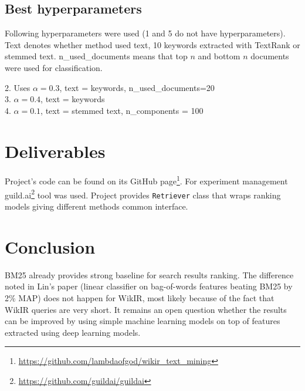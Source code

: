\documentclass{article}
\begin{document}
\subsection{Best hyperparameters}
Following hyperparameters were used (1 and 5 do not have hyperparameters). Text denotes whether method used text, 10 keywords extracted with TextRank or stemmed text. n\_used\_documents means that top $n$ and bottom $n$ documents were used for classification. 

2. Uses $\alpha = 0.3$, text = keywords,  n\_used\_documents=20 \\

3. $\alpha = 0.4$, text = keywords \\ 

4. $\alpha = 0.1$, text = stemmed text, n\_components = 100 \\


\section{Deliverables}

Project's code can be found on its GitHub page\footnote{\href{https://github.com/lambdaofgod/wikir_text_mining}{https://github.com/lambdaofgod/wikir\_text\_mining}}. For experiment management guild.ai\footnote{\href{https://github.com/guildai/guildai}{https://github.com/guildai/guildai}} tool was used. Project provides \texttt{Retriever} class that wraps ranking models giving different methods common interface.

\section{Conclusion}
BM25 already provides strong baseline for search results ranking. The difference noted in Lin's paper \citep{DBLP:journals/corr/abs-1904-08861} (linear classifier on bag-of-words features beating BM25 by 2\% MAP) does not happen for WikIR, most likely because of the fact that WikIR queries are very short. It remains an open question whether the results can be improved by using simple machine learning models on top of features extracted using deep learning models.
\end{document}
